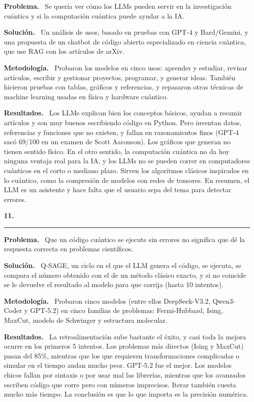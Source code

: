 \documentclass[11pt,a4paper]{article}
\newcommand{\paper}[1]{\vspace{1.2em}\par{\large\textbf{#1}}\par\vspace{0.2em}\hrule\vspace{0.4em}}
\newcommand{\parte}[1]{\par\textbf{#1.}\ }
\begin{document}
\parte{Problema}
Se quería ver cómo los LLMs pueden servir en la investigación cuántica y si la computación cuántica puede ayudar a la IA.

\parte{Solución}
Un análisis de usos, basado en pruebas con GPT-4 y Bard/Gemini, y una propuesta de un chatbot de código abierto especializado en ciencia cuántica, que use RAG con los artículos de arXiv.

\parte{Metodología}
Probaron los modelos en cinco usos: aprender y estudiar, revisar artículos, escribir y gestionar proyectos, programar, y generar ideas. También hicieron pruebas con tablas, gráficos y referencias, y repasaron otras técnicas de machine learning usadas en física y hardware cuántico.

\parte{Resultados}
Los LLMs explican bien los conceptos básicos, ayudan a resumir artículos y son muy buenos escribiendo código en Python. Pero inventan datos, referencias y funciones que no existen, y fallan en razonamientos finos (GPT-4 sacó 69/100 en un examen de Scott Aaronson). Los gráficos que generan no tienen sentido físico. En el otro sentido, la computación cuántica no da hoy ninguna ventaja real para la IA, y los LLMs no se pueden correr en computadores cuánticos en el corto o mediano plazo. Sirven los algoritmos clásicos inspirados en lo cuántico, como la compresión de modelos con redes de tensores. En resumen, el LLM es un asistente y hace falta que el usuario sepa del tema para detectar errores.

\paper{11.}

\parte{Problema}
Que un código cuántico se ejecute sin errores no significa que dé la respuesta correcta en problemas científicos.

\parte{Solución}
Q-SAGE, un ciclo en el que el LLM genera el código, se ejecuta, se compara el número obtenido con el de un método clásico exacto, y si no coincide se le devuelve el resultado al modelo para que corrija (hasta 10 intentos).

\parte{Metodología}
Probaron cinco modelos (entre ellos DeepSeek-V3.2, Qwen3-Coder y GPT-5.2) en cinco familias de problemas: Fermi-Hubbard, Ising, MaxCut, modelo de Schwinger y estructura molecular.

\parte{Resultados}
La retroalimentación sube bastante el éxito, y casi toda la mejora ocurre en los primeros 5 intentos. Los problemas más directos (Ising y MaxCut) pasan del 85\%, mientras que los que requieren transformaciones complicadas o simular en el tiempo andan mucho peor. GPT-5.2 fue el mejor. Los modelos chicos fallan por sintaxis o por usar mal las librerías, mientras que los avanzados escriben código que corre pero con números imprecisos. Iterar también cuesta mucho más tiempo. La conclusión es que lo que importa es la precisión numérica.
\end{document}
